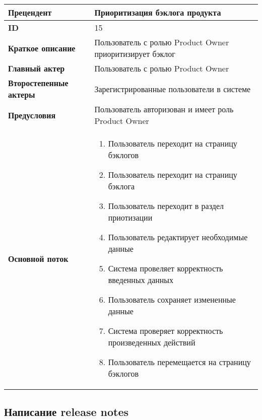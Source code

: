 \documentclass[14pt,a4paper]{extarticle}
\begin{document}
\begin{tabular}{|l|p{9cm}|}
	\hline
	\textbf{Прецендент}            & Приоритизация бэклога продукта                             \\
	\hline
	\textbf{ID}                    & 15                                                         \\
	\hline
	\textbf{Краткое описание}      & Пользователь с ролью Product Owner приоритизирует бэклог   \\
	\hline
	\textbf{Главный актер}         & Пользователь с ролью Product Owner                         \\
	\hline
	\textbf{Второстепенные актеры} & Зарегистрированные пользователи в системе                  \\
	\hline
	\textbf{Предусловия}           & Пользователь авторизован и имеет роль Product Owner        \\
	\hline
	\textbf{Основной поток}        & \begin{enumerate}
		                                 \item Пользователь переходит на страницу бэклогов
		                                 \item Пользователь переходит на страницу бэклога
		                                 \item Пользователь переходит в раздел приотизации
		                                 \item Пользователь редактирует необходимые данные
		                                 \item Система провеляет корректность введенных данных
		                                 \item Пользователь сохраняет измененные данные
		                                 \item Система проверяет корректность произведенных действий
		                                 \item Пользователь перемещается на страницу бэклогов
	                                 \end{enumerate} \\
	\hline
\end{tabular}

\subsection{Написание release notes}
\end{document}
